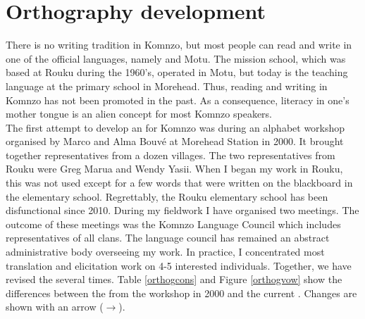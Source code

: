 \section{Orthography development}\label{orthographydev}

There is no writing tradition in Komnzo, but most people can read and write in one of the official languages, namely  and Motu. The mission school, which was based at Rouku during the 1960's, operated in Motu, but today  is the teaching language at the primary school in Morehead. Thus, reading and writing in Komnzo has not been promoted in the past. As a consequence, literacy in one's mother tongue is an alien concept for most Komnzo speakers.\\

The first attempt to develop an  for Komnzo was during an alphabet workshop organised by Marco and Alma Bouvé at Morehead Station in 2000. It brought together representatives from a dozen villages. The two representatives from Rouku were Greg Marua and Wendy Yasii. When I began my work in Rouku, this  was not used except for a few words that were written on the blackboard in the elementary school. Regrettably, the Rouku elementary school has been disfunctional since 2010. During my fieldwork I have organised two  meetings. The outcome of these meetings was the Komnzo Language Council which includes representatives of all clans. The language council has remained an abstract administrative body overseeing my work. In practice, I concentrated most translation and elicitation work on 4-5 interested individuals. Together, we have revised the  several times. Table \ref{orthogcons} and Figure \ref{orthogvow} show the differences between the  from the workshop in 2000 and the current . Changes are shown with an arrow ($\rightarrow$).

